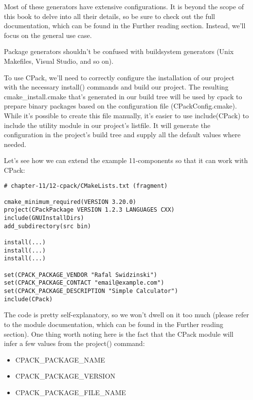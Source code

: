 Most of these generators have extensive configurations. It is beyond the scope of this book to delve into all their details, so be sure to check out the full documentation, which can be found in the Further reading section. Instead, we'll focus on the general use case.

\begin{tcolorbox}[colback=blue!5!white,colframe=blue!75!black,title=Note]
Package generators shouldn't be confused with buildsystem generators (Unix Makefiles, Visual Studio, and so on).
\end{tcolorbox}

To use CPack, we'll need to correctly configure the installation of our project with the necessary install() commands and build our project. The resulting cmake\_install.cmake that's generated in our build tree will be used by cpack to prepare binary packages based on the configuration file (CPackConfig.cmake). While it's possible to create this file manually, it's easier to use include(CPack) to include the utility module in our project's listfile. It will generate the configuration in the project's build tree and supply all the default values where needed.

Let's see how we can extend the example 11-components so that it can work with CPack:

\begin{lstlisting}[style=styleCMake]
# chapter-11/12-cpack/CMakeLists.txt (fragment)

cmake_minimum_required(VERSION 3.20.0)
project(CPackPackage VERSION 1.2.3 LANGUAGES CXX)
include(GNUInstallDirs)
add_subdirectory(src bin)

install(...)
install(...)
install(...)

set(CPACK_PACKAGE_VENDOR "Rafal Swidzinski")
set(CPACK_PACKAGE_CONTACT "email@example.com")
set(CPACK_PACKAGE_DESCRIPTION "Simple Calculator")
include(CPack)
\end{lstlisting}

The code is pretty self-explanatory, so we won't dwell on it too much (please refer to the module documentation, which can be found in the Further reading section). One thing worth noting here is the fact that the CPack module will infer a few values from the project() command:

\begin{itemize}
\item 
CPACK\_PACKAGE\_NAME

\item 
CPACK\_PACKAGE\_VERSION

\item 
CPACK\_PACKAGE\_FILE\_NAME
\end{itemize}

